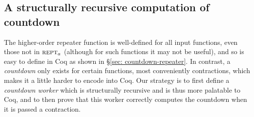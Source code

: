 
\subsection{A structurally recursive computation of countdown}

The higher-order repeater function is well-defined for all input functions,
even those not in $\text{\scshape{rept}}_a$ (although for such functions it may not
be useful), and so is easy to define
in Coq as shown in \S\ref{sec: countdown-repeater}. In contrast, a
\emph{countdown} only exists for certain functions, most conveniently
contractions, which makes it a little harder to encode into Coq.
Our strategy is to first define a \emph{countdown worker} which is
structurally recursive and is thus more palatable to Coq, and to then
prove that this worker correctly computes the countdown when it is 
passed a contraction.

